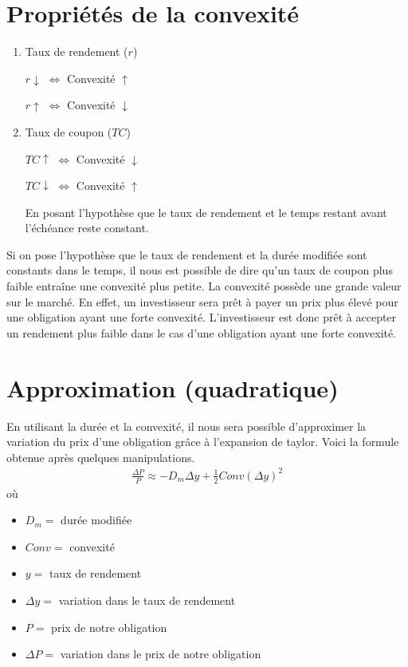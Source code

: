 \documentclass[12pt]{article}
\begin{document}
\section{Propriétés de la convexité}
\begin{enumerate}
\item Taux de rendement ($r$)
\begin{center}
$r \downarrow$ \hspace{1cm} $\Longleftrightarrow$  \hspace{1cm} Convexité $\uparrow$
\end{center}
\begin{center}
$r \uparrow$ \hspace{1cm} $\Longleftrightarrow$  \hspace{1cm} Convexité $\downarrow$
\end{center}
\item Taux de coupon ($TC$)
\begin{center}
$TC \uparrow$ \hspace{1cm} $\Longleftrightarrow$  \hspace{1cm} Convexité $\downarrow$
\end{center}
\begin{center}
$TC \downarrow$ \hspace{1cm} $\Longleftrightarrow$  \hspace{1cm} Convexité $\uparrow$
\end{center}
En posant l'hypothèse que le taux de rendement et le temps restant avant l'échéance reste constant.
\end{enumerate}
Si on pose l'hypothèse que le taux de rendement et la durée modifiée sont constants dans le temps,  il nous est possible de dire qu'un taux de coupon plus faible entraîne une convexité plus petite.  La convexité possède une grande valeur sur le marché. En effet,  un investisseur sera prêt à payer un prix plus élevé pour une obligation ayant une forte convexité.  L'investisseur est donc prêt à accepter un rendement plus faible dans le cas d'une obligation ayant une forte convexité.

\section{Approximation (quadratique)}
En utilisant la durée et la convexité,  il nous sera possible d'approximer la variation du prix d'une obligation grâce à l'expansion de taylor.  Voici la formule obtenue après quelques manipulations.
\begin{align*}
\frac{\Delta P}{P} \approx -D_m \Delta y +\frac{1}{2} Conv(\Delta y)^2
\end{align*}
où 
\begin{itemize}
\item $D_m=$ durée modifiée 
\item $Conv=$ convexité
\item $y=$ taux de rendement 
\item $\Delta y=$ variation dans le taux de rendement 
\item $P=$ prix de notre obligation 
\item $\Delta P=$ variation dans le prix de notre obligation 
\end{itemize}
\end{document}
